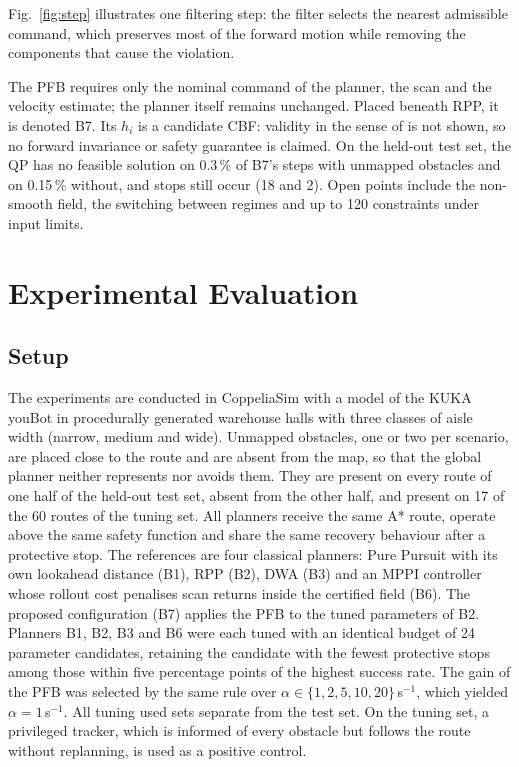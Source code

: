 \documentclass[conference]{IEEEtran}
\begin{document}
Fig.~\ref{fig:step} illustrates one filtering step: the filter selects the nearest admissible command, which
preserves most of the forward motion while removing the components that cause the violation.

The PFB requires only the nominal command of the planner, the scan and the velocity estimate; the planner
itself remains unchanged. Placed beneath RPP, it is denoted B7. Its $h_i$ is a candidate CBF: validity in the
sense of \cite[Def.~2.1]{garg2024advances} is not shown, so no forward invariance or safety guarantee is
claimed. On the held-out test set, the QP has no feasible solution on 0.3\,\% of B7's steps with unmapped
obstacles and on 0.15\,\% without, and stops still occur (18 and 2). Open points include the non-smooth field,
the switching between regimes and up to 120 constraints under input limits.

\section{Experimental Evaluation}
\subsection{Setup}
The experiments are conducted in CoppeliaSim \cite{rohmer2013vrep} with a model of the KUKA youBot
in procedurally generated warehouse halls with three classes of aisle width (narrow, medium and
wide). Unmapped obstacles, one or two per scenario, are placed close to the route and are absent from the
map, so that the global planner neither represents nor avoids them. They are present on every route of one half of
the held-out test set, absent from the other half, and present on 17 of the 60 routes of the tuning set. All planners receive the
same A* route, operate above the same safety function and share the same recovery behaviour after a
protective stop. The references are four classical planners: Pure Pursuit with its own lookahead distance
(B1), RPP (B2), DWA (B3) and an MPPI controller whose rollout cost penalises scan returns inside the
certified field (B6). The proposed configuration (B7) applies the PFB to the tuned parameters of B2.
Planners B1, B2, B3 and B6 were each tuned with an identical budget of 24 parameter candidates, retaining
the candidate with the fewest protective stops among those within five percentage points of the highest
success rate. The gain of the PFB was selected by the same rule over $\alpha\in\{1,2,5,10,20\}$\,s$^{-1}$,
which yielded $\alpha=1$\,s$^{-1}$. All tuning used sets separate from the test set. On the tuning set, a
privileged tracker, which is informed of every obstacle but follows the route without replanning, is used as a positive control.
\end{document}
